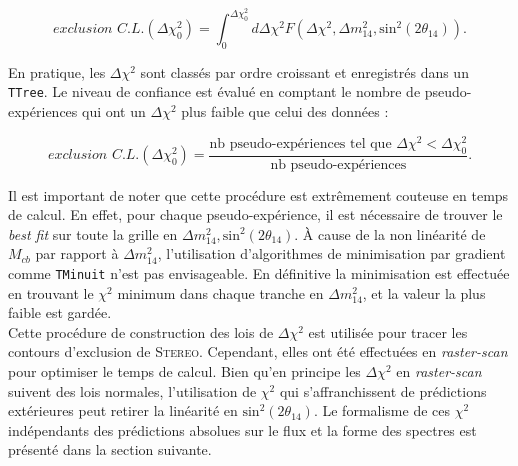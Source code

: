 \begin{equation}
    \textit{exclusion C.L.}\left(\Delta\chi^2_0 \right) = \int_{0}^{\Delta\chi^2_0} d\Delta\chi^2 F\left(\Delta\chi^2, \Delta m_{14}^2, \textrm{sin}^2(2\theta_{14})\right).
\end{equation}

\bigbreak

En pratique, les $\Delta\chi^2$ sont classés par ordre croissant et enregistrés dans un \texttt{TTree}. Le niveau de confiance est évalué en comptant le nombre de pseudo-expériences qui ont un $\Delta\chi^2$ plus faible que celui des données :

\begin{equation}
    \textit{exclusion C.L.}\left(\Delta\chi^2_0 \right) = \frac{\textrm{nb pseudo-expériences tel que } \Delta\chi^2 < \Delta\chi^2_0}{\textrm{nb pseudo-expériences}}.
\end{equation}

\bigbreak

Il est important de noter que cette procédure est extrêmement couteuse en temps de calcul. En effet, pour chaque pseudo-expérience, il est nécessaire de trouver le \textit{best fit} sur toute la grille en $\Delta m^2_{14}, \textrm{sin}^2(2\theta_{14})$. À cause de la non linéarité de $M_{cb}$ par rapport à $\Delta m^2_{14}$,  l'utilisation d'algorithmes de minimisation par gradient comme \texttt{TMinuit} n'est pas envisageable. En définitive la minimisation est effectuée en trouvant le $\chi^2$ minimum dans chaque tranche en $\Delta m^2_{14}$, et la valeur la plus faible est gardée.\\

Cette procédure de construction des lois de $\Delta\chi^2$ est utilisée pour tracer les contours d'exclusion de \textsc{Stereo}. Cependant, elles ont été effectuées en \textit{raster-scan} pour optimiser le temps de calcul. Bien qu'en principe les $\Delta\chi^2$ en \textit{raster-scan} suivent des lois normales, l'utilisation de $\chi^2$ qui s'affranchissent de prédictions extérieures peut retirer la linéarité en $\textrm{sin}^2(2\theta_{14})$. Le formalisme de ces $\chi^2$ indépendants des prédictions absolues sur le flux et la forme des spectres est présenté dans la section suivante.

\bigbreak


